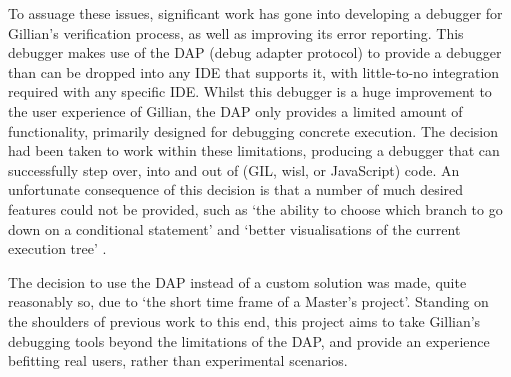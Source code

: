 To assuage these issues, significant work has gone into developing a debugger
for Gillian's verification process, as well as improving its error reporting.
This debugger makes use of the DAP (debug adapter protocol) to provide a
debugger than can be dropped into any IDE that supports it, with little-to-no
integration required with any specific IDE. Whilst this debugger is a huge
improvement to the user experience of Gillian, the DAP only provides a limited
amount of functionality, primarily designed for debugging concrete execution.
The decision had been taken to work within these limitations, producing a
debugger that can successfully step over, into and out of (GIL, wisl, or
JavaScript) code. An unfortunate consequence of this decision is that a number
of much desired features could not be provided, such as `the ability to choose
which branch to go down on a conditional statement' and `better visualisations
of the current execution tree' \cite[p.~49]{gillian-debugging-2021}.

The decision to use the DAP instead of a custom solution was made, quite
reasonably so, due to `the short time frame of a Master’s project'. Standing on
the shoulders of previous work to this end, this project aims to take Gillian's
debugging tools beyond the limitations of the DAP, and provide an experience
befitting real users, rather than experimental scenarios.
